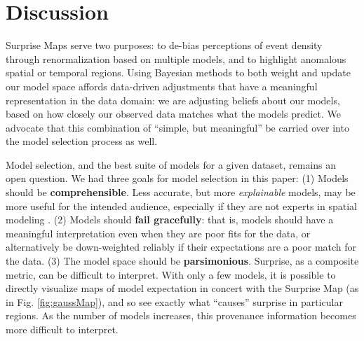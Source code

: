 \documentclass[journal]{vgtc}                %
\begin{document}
\section{Discussion}

Surprise Maps serve two purposes: to de-bias perceptions of event density through renormalization based on multiple models, and to highlight anomalous spatial or temporal regions. Using Bayesian methods to both weight and update our model space affords data-driven adjustments that have a meaningful representation in the data domain: we are adjusting beliefs about our models, based on how closely our observed data matches what the models predict. We advocate that this combination of ``simple, but meaningful'' be carried over into the model selection process as well.


Model selection, and the best suite of models for a given dataset, remains an open question. We had three goals for model selection in this paper: (1) Models should be \textbf{comprehensible}. Less accurate, but more \emph{explainable} models, may be more useful for the intended audience, especially if they are not experts in spatial modeling \cite{Gle16}. (2) Models should \textbf{fail gracefully}: that is, models should have a meaningful interpretation even when they are poor fits for the data, or alternatively be down-weighted reliably if their expectations are a poor match for the data. (3) The model space should be \textbf{parsimonious}. Surprise, as a composite metric, can be difficult to interpret. With only a few models, it is possible to directly visualize maps of model expectation in concert with the Surprise Map (as in Fig. \ref{fig:gaussMap}), and so see exactly what ``causes'' surprise in particular regions. As the number of models increases, this provenance information becomes more difficult to interpret.
\end{document}
